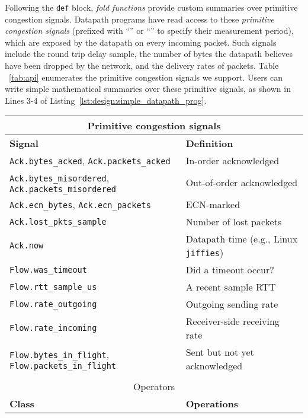 Following the \texttt{def} block, \textit{fold functions} provide custom summaries over primitive congestion signals.
Datapath programs have read access to these \textit{primitive congestion signals} (prefixed with ``'' or ``'' to specify their measurement period), which are exposed by the datapath on every incoming packet. Such signals include the round trip delay sample, the number of bytes the datapath believes have been dropped by the network, and the delivery rates of packets. Table ~\ref{tab:api} enumerates the primitive congestion signals we support.
Users can write simple mathematical summaries over these primitive signals, as shown in Lines 3-4 of Listing~\ref{lst:design:simple_datapath_prog}.
%
\begin{table}
    \centering
    \footnotesize
    \begin{tabular}{@{} p{}p{}}
        \hline
        \hline
        \multicolumn{2}{c}{Primitive congestion signals} \\
        \hline
        \hline
        \textbf{Signal} & \textbf{Definition} \\
        \texttt{Ack.bytes\_acked}, \texttt{Ack.packets\_acked} & In-order acknowledged \\
        \texttt{Ack.bytes\_misordered}, \texttt{Ack.packets\_misordered} & Out-of-order acknowledged \\
        \texttt{Ack.ecn\_bytes}, \texttt{Ack.ecn\_packets} & ECN-marked \\
        \texttt{Ack.lost\_pkts\_sample} & Number of lost packets \\
        \texttt{Ack.now} & Datapath time (e.g., Linux \texttt{jiffies})\\
        \texttt{Flow.was\_timeout} & Did a timeout occur? \\
        \texttt{Flow.rtt\_sample\_us} & A recent sample RTT \\
        \texttt{Flow.rate\_outgoing} & Outgoing sending rate \\
        \texttt{Flow.rate\_incoming} & Receiver-side receiving rate  \\
        \texttt{Flow.bytes\_in\_flight}, \texttt{Flow.packets\_in\_flight} & Sent but not yet acknowledged \\
        & \\
        \hline
        \hline
        \multicolumn{2}{c}{Operators} \\
        \hline
        \hline
        \textbf{Class} & \textbf{Operations} \\

\end{tabular}
\end{table}

